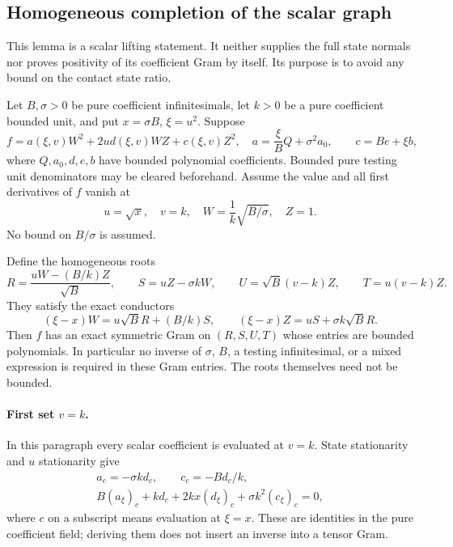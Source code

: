 \subsection{Homogeneous completion of the scalar graph}
\label{component:pbb29c73cc124}

\label{pbb29c73cc124:sec:unbounded-b-homogeneous-scalar}

This lemma is a scalar lifting statement.  It neither supplies the full
state normals nor proves positivity of its coefficient Gram by itself.
Its purpose is to avoid any bound on the contact state ratio.

Let $B,\sigma>0$ be pure coefficient infinitesimals, let $k>0$ be a
pure coefficient bounded unit, and put $x=\sigma B$, $\xi=u^2$.
Suppose
\[
 f=a(\xi,v)W^2+2u d(\xi,v)WZ+c(\xi,v)Z^2,
 \quad
 a=\frac\xi B Q+\sigma^2 a_0,\qquad
 c=B e+\xi b,                                      \tag{HL1}
\]
where $Q,a_0,d,e,b$ have bounded polynomial coefficients.  Bounded
pure testing unit denominators may be cleared beforehand.
Assume the value and all first derivatives of $f$ vanish at
\[
 u=\sqrt{x},\quad v=k,\quad
 W=\frac1k\sqrt{B/\sigma},\quad Z=1.                \tag{HL2}
\]
No bound on $B/\sigma$ is assumed.

Define the homogeneous roots
\[
 R=\frac{uW-(B/k)Z}{\sqrt B},\qquad
 S=uZ-\sigma kW,\qquad
 U=\sqrt B(v-k)Z,\qquad T=u(v-k)Z.                 \tag{HL3}
\]
They satisfy the exact conductors
\[
 (\xi-x)W=u\sqrt B R+(B/k)S,
 \qquad
 (\xi-x)Z=uS+\sigma k\sqrt B R.                    \tag{HL4}
\]
Then $f$ has an exact symmetric Gram on $(R,S,U,T)$ whose entries
are bounded polynomials.  In particular no inverse of $\sigma$,
$B$, a testing infinitesimal, or a mixed expression is required in
these Gram entries.  The roots themselves need not be bounded.

\paragraph{First set $v=k$.}
In this paragraph every scalar coefficient is evaluated at $v=k$.
State stationarity and $u$ stationarity give
\begin{gather*}
 a_c=-\sigma k d_c,\qquad c_c=-B d_c/k,\\
 B(a_\xi)_c+kd_c+2kx(d_\xi)_c
                      +\sigma k^2(c_\xi)_c=0,     \tag{HL5}
\end{gather*}
where $c$ on a subscript means evaluation at $\xi=x$.
These are identities in the pure coefficient field; deriving them
does not insert an inverse into a tensor Gram.

